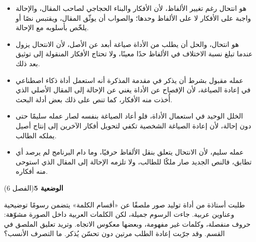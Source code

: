 \documentclass[11pt,a4paper]{article}
\begin{document}
\begin{itemize}[leftmargin=1.0cm, labelsep=6pt, itemsep=3pt, topsep=4pt, parsep=0pt]
  \item[\textbf{أ)}] هو انتحال رغم تغيير الألفاظ، لأن الأفكار والبناء الحجاجي لصاحب المقال، والإحالة واجبة على الأفكار لا على الألفاظ وحدها؛ والصواب أن يوثّق المقال، ويقتبس نصًا أو يلخّص بأسلوبه مع الإحالة.
  \item[\textbf{ب)}] هو انتحال، والحل أن يطلب من الأداة صياغة أبعد عن الأصل، لأن الانتحال يزول عندما تبلغ نسبة الاختلاف في الألفاظ حدًا معينًا، ولا تحتاج الأفكار المنقولة إلى توثيق بعد ذلك.
  \item[\textbf{ج)}] عمله مقبول بشرط أن يذكر في مقدمة المذكرة أنه استعمل أداة ذكاء اصطناعي في إعادة الصياغة، لأن الإفصاح عن الأداة يغني عن الإحالة إلى المقال الأصلي الذي أُخذت منه الأفكار، كما تنص على ذلك بعض أدلة البحث.
  \item[\textbf{د)}] الخلل الوحيد في استعمال الأداة، فلو أعاد الصياغة بنفسه لصار عمله سليمًا حتى دون إحالة، لأن إعادة الصياغة الشخصية تكفي لتحويل أفكار الآخرين إلى إنتاج أصيل يملكه الطالب.
  \item[\textbf{هـ)}] عمله سليم، لأن الانتحال يتعلق بنقل الألفاظ حرفيًا، وما دام البرنامج لم يرصد أي تطابق، فالنص الجديد صار ملكًا للطالب، ولا تلزمه الإحالة إلى المقال الذي استوحى منه أفكاره.
\end{itemize}
\par\vspace{6pt}
\noindent
{\large\khatt\textbf{الوضعية 5}}\hfill{\small(الفصل 6)}\par\nopagebreak\vspace{3pt}
\setlength{\fboxsep}{7pt}\colorbox{gray!10}{\parbox{\dimexpr\linewidth-14pt}{طلبت أستاذة من أداة توليد صور ملصقًا عن «أقسام الكلمة» يتضمن رسومًا توضيحية وعناوين عربية. جاءت الرسوم جميلة، لكن الكلمات العربية داخل الصورة مشوّهة: حروف منفصلة، وكلمات غير مفهومة، وبعضها معكوس الاتجاه. وتريد تعليق الملصق في القسم. وقد جرّبت إعادة الطلب مرتين دون تحسّن يُذكر. ما التصرف الأنسب؟}}\par\nopagebreak
\end{document}
